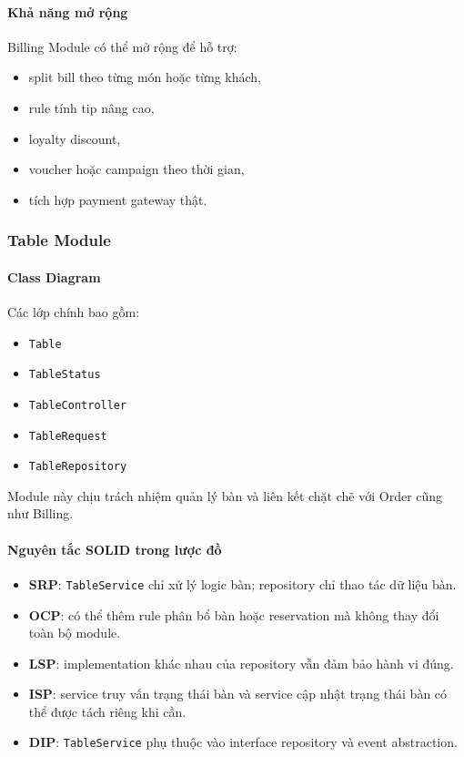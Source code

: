 \documentclass[12pt,a4paper]{article}
\begin{document}
\paragraph{Khả năng mở rộng}
Billing Module có thể mở rộng để hỗ trợ:
\begin{itemize}
    \item split bill theo từng món hoặc từng khách,
    \item rule tính tip nâng cao,
    \item loyalty discount,
    \item voucher hoặc campaign theo thời gian,
    \item tích hợp payment gateway thật.
\end{itemize}

\subsubsection{Table Module}

\paragraph{Class Diagram}
Các lớp chính bao gồm:
\begin{itemize}
    \item \texttt{Table}
    \item \texttt{TableStatus}
    \item \texttt{TableController}
    \item \texttt{TableRequest}
    \item \texttt{TableRepository}
\end{itemize}

Module này chịu trách nhiệm quản lý bàn và liên kết chặt chẽ với Order cũng như Billing.

\paragraph{Nguyên tắc SOLID trong lược đồ}
\begin{itemize}
    \item \textbf{SRP}: \texttt{TableService} chỉ xử lý logic bàn; repository chỉ thao tác dữ liệu bàn.
    \item \textbf{OCP}: có thể thêm rule phân bổ bàn hoặc reservation mà không thay đổi toàn bộ module.
    \item \textbf{LSP}: implementation khác nhau của repository vẫn đảm bảo hành vi đúng.
    \item \textbf{ISP}: service truy vấn trạng thái bàn và service cập nhật trạng thái bàn có thể được tách riêng khi cần.
    \item \textbf{DIP}: \texttt{TableService} phụ thuộc vào interface repository và event abstraction.
\end{itemize}
\end{document}
